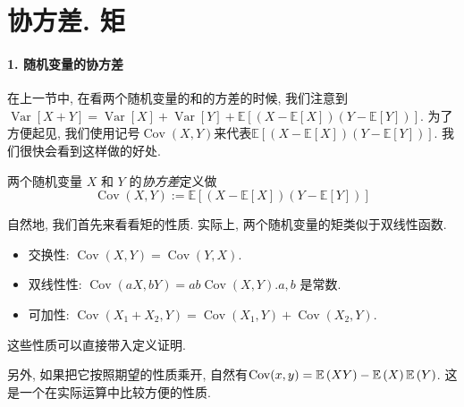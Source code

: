 \section{协方差. 矩}

\paragraph{1. 随机变量的协方差}在上一节中, 在看两个随机变量的和的方差的时候, 我们注意到$\operatorname{Var}[X+Y]=\operatorname{Var}[X]+\operatorname{Var}[Y]+\mathbb{E}[(X-\mathbb{E}[X])(Y-\mathbb{E}[Y])]$. 为了方便起见, 我们使用记号$\operatorname{Cov}(X, Y)$来代表$\mathbb{E}[(X-\mathbb{E}[X])(Y-\mathbb{E}[Y])]$. 我们很快会看到这样做的好处. 

\begin{definition}
    两个随机变量 $X$ 和 $Y$ 的\emph{协方差}定义做
$$
\operatorname{Cov}(X, Y):=\mathbb{E}[(X-\mathbb{E}[X])(Y-\mathbb{E}[Y])]
$$
\end{definition}

自然地, 我们首先来看看矩的性质. 实际上, 两个随机变量的矩类似于双线性函数. 

\begin{itemize}
    \item 交换性: $\operatorname{Cov}(X, Y)=\operatorname{Cov}(Y, X)$.
    \item 双线性性: $\operatorname{Cov}(a X, b Y)=a b \operatorname{Cov}(X, Y). a, b$ 是常数.
    \item 可加性: $\operatorname{Cov}\left(X_1+X_2, Y\right)=\operatorname{Cov}\left(X_1, Y\right)+\operatorname{Cov}\left(X_2, Y\right)$.
\end{itemize}

这些性质可以直接带入定义证明. 

另外, 如果把它按照期望的性质乘开, 自然有$\operatorname{Cov}(x,y)=\mathbb E\left(XY\right)-\mathbb E\left(X\right)\mathbb E\left(Y\right)$. 这是一个在实际运算中比较方便的性质. 

